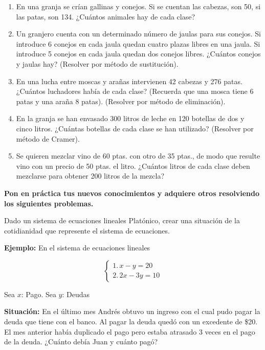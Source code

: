 \documentclass[12pt,a4paper]{article}
\begin{document}
\begin{enumerate}
    \item En una granja se crían gallinas y conejos. Si se cuentan las cabezas, son 50, si las patas, son 134. ¿Cuántos animales hay de cada clase?

    \item Un granjero cuenta con un determinado número de jaulas para sus conejos. Si introduce 6 conejos en cada jaula quedan cuatro plazas libres en una jaula. Si introduce 5 conejos en cada jaula quedan dos conejos libres. ¿Cuántos conejos y jaulas hay? (Resolver por método de sustitución).

    \item En una lucha entre moscas y arañas intervienen 42 cabezas y 276 patas. ¿Cuántos luchadores había de cada clase? (Recuerda que una mosca tiene 6 patas y una araña 8 patas). (Resolver por método de eliminación).

    \item En la granja se han envasado 300 litros de leche en 120 botellas de dos y cinco litros. ¿Cuántas botellas de cada clase se han utilizado? (Resolver por método de Cramer).

    \item Se quieren mezclar vino de 60 ptas. con otro de 35 ptas., de modo que resulte vino con un precio de 50 ptas. el litro. ¿Cuántos litros de cada clase deben mezclarse para obtener 200 litros de la mezcla?
\end{enumerate}

\vspace{1cm}

\textbf{Pon en práctica tus nuevos conocimientos y adquiere otros resolviendo los siguientes problemas.}

Dado un sistema de ecuaciones lineales Platónico, crear una situación de la cotidianidad que represente el sistema de ecuaciones.

\textbf{Ejemplo:} En el sistema de ecuaciones lineales

\[ \begin{cases}
1. \, x - y = 20 \\
2. \, 2x - 3y = 10
\end{cases} \]

Sea $x$: Pago. \quad Sea $y$: Deudas

\textbf{Situación:} En el último mes Andrés obtuvo un ingreso con el cual pudo pagar la deuda que tiene con el banco. Al pagar la deuda quedó con un excedente de \$20. El mes anterior había duplicado el pago pero estaba atrasado 3 veces en el pago de la deuda. ¿Cuánto debía Juan y cuánto pagó?
\end{document}
